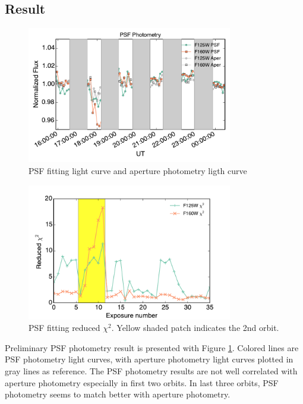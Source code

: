 \documentclass[paper=letter, fontsize=11pt]{scrartcl} %
\numberwithin{equation}{section} %
\numberwithin{figure}{section} %
\numberwithin{table}{section} %
\begin{document}
 \subsection{Result}
 \begin{figure}
   \centering
   \includegraphics[width = 0.8\textwidth]{PSFPhotometry_Nov20}
   \caption{PSF fitting light curve and aperture photometry ligth
     curve}
   \label{fig:psf}
 \end{figure}

 \begin{figure}
   \centering
   \includegraphics[width = 0.8\textwidth]{PSFFitChisq}
   \caption{PSF fitting reduced $\chi^2$. Yellow shaded patch
     indicates the 2nd orbit.}
   \label{fig:chisq}
 \end{figure}

 Preliminary PSF photometry result is presented with
 Figure \ref{fig:psf}. Colored lines are PSF photometry light curves, with
 aperture photometry light curves plotted in gray lines as
 reference. The PSF photometry results are not well correlated with
 aperture photometry especially in first two orbits. In last three
 orbits, PSF photometry seems to match better with aperture
 photometry.\par
\end{document}
